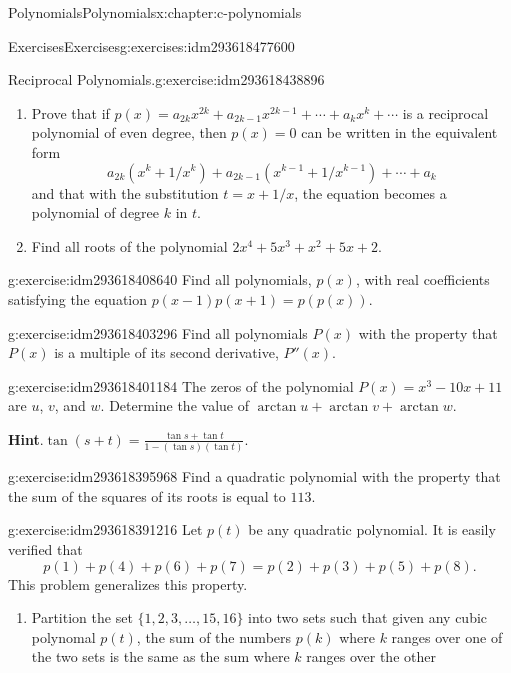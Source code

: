 \documentclass[twoside,10pt,]{book}
\newcommand{\blocktitlefont}{\relax}
\numberwithin{equation}{section}
\begin{document}
\begin{chapterptx}{Polynomials}{}{Polynomials}{}{}{x:chapter:c-polynomials}
\begin{exercises-section}{Exercises}{}{Exercises}{}{}{g:exercises:idm293618477600}
\begin{divisionexercise}{7}{Reciprocal Polynomials.}{}{g:exercise:idm293618438896}
\begin{enumerate}[label=(\alph*)]
\item{}Prove that if \(p(x) = a_{2k} x^{2k} + a_{2k-1}x^{2k-1}+ \cdots +a_{k} x^k + \cdots\) is a reciprocal polynomial of even degree, then \(p(x)= 0\) can be written in the equivalent form%
\begin{equation*}
a_{2k} (x^k+1/x^k) + a_{2k-1} (x^{k-1}+1/x^{k-1}) + \cdots +a_{k} 
\end{equation*}
and that with the substitution \(t=x+1/x\), the equation becomes a polynomial of degree \(k\) in \(t\).%
\item{}Find all roots of the polynomial \(2 x^4 + 5 x^3 + x^2 + 5 x + 2\).%
\end{enumerate}
%
\end{divisionexercise}%
\begin{divisionexercise}{8}{}{}{g:exercise:idm293618408640}%
Find all polynomials, \(p(x)\), with real coefficients satisfying the equation \(p(x-1)p(x+1) = p(p(x))\).%
\end{divisionexercise}%
\begin{divisionexercise}{9}{}{}{g:exercise:idm293618403296}%
Find all polynomials \(P(x)\) with the property that \(P(x)\) is a multiple of its second derivative, \(P''(x)\).%
\end{divisionexercise}%
\begin{divisionexercise}{10}{}{}{g:exercise:idm293618401184}%
The zeros of the polynomial \(P(x) = x^3 - 10x + 11\) are \(u\), \(v\), and \(w\). Determine the value of \(\arctan  u + \arctan v + \arctan  w\).%
\par\smallskip%
\noindent\textbf{\blocktitlefont Hint}.\label{g:hint:idm293618400352}{}\hypertarget{g:hint:idm293618400352}{}\quad{}\(\tan(s+t)=\frac{\tan  s + \tan  t }{1-(\tan  s )(\tan  t)}\).%
\end{divisionexercise}%
\begin{divisionexercise}{11}{}{}{g:exercise:idm293618395968}%
Find a quadratic polynomial with the property that the sum of the squares of its roots is equal to \(113\).%
\end{divisionexercise}%
\begin{divisionexercise}{12}{}{}{g:exercise:idm293618391216}%
Let \(p(t)\) be any quadratic polynomial.  It is easily verified that%
\begin{equation*}
p(1)+p(4)+p(6)+p(7) = p(2)+p(3)+p(5)+p(8).
\end{equation*}
This problem generalizes this property.%
\begin{enumerate}[label=(\alph*)]
\item{}Partition the set \(\{1, 2, 3, \dots , 15, 16\}\) into two sets such that given any cubic polynomal \(p(t)\), the sum of the numbers \(p(k)\) where \(k\) ranges over one of  the two sets is the same as the sum where \(k\) ranges over the other%

\end{enumerate}
\end{divisionexercise}
\end{exercises-section}
\end{chapterptx}
\end{document}
